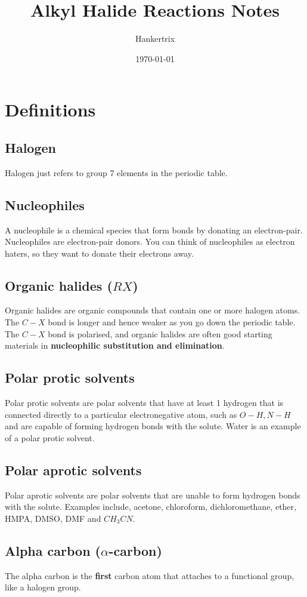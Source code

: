 \documentclass[11pt]{article}
\author{Hankertrix}
\date{\today}
\title{Alkyl Halide Reactions Notes}
\begin{document}
\maketitle
\setcounter{tocdepth}{2}
\tableofcontents \clearpage\section{Definitions}
\label{sec:org581be72}

\subsection{Halogen}
\label{sec:org85df69c}
Halogen just refers to group 7 elements in the periodic table.
\subsection{Nucleophiles}
\label{sec:orgd9ce489}
A nucleophile is a chemical species that form bonds by donating an electron-pair. Nucleophiles are electron-pair donors. You can think of nucleophiles as electron haters, so they want to donate their electrons away.
\subsection{Organic halides (\(RX\))}
\label{sec:orgf95e5ea}
Organic halides are organic compounds that contain one or more halogen atoms. The \(C - X\) bond is longer and hence weaker as you go down the periodic table. The \(C - X\) bond is polarised, and organic halides are often good starting materials in \textbf{nucleophilic substitution and elimination}.
\subsection{Polar protic solvents}
\label{sec:org1988e9f}
Polar protic solvents are polar solvents that have at least 1 hydrogen that is connected directly to a particular electronegative atom, such as \(O-H, N-H\) and are capable of forming hydrogen bonds with the solute. Water is an example of a polar protic solvent.
\subsection{Polar aprotic solvents}
\label{sec:org14b91c7}
Polar aprotic solvents are polar solvents that are unable to form hydrogen bonds with the solute. Examples include, acetone, chloroform, dichloromethane, ether, HMPA, DMSO, DMF and \(CH_3 CN\).
\subsection{Alpha carbon (\(\alpha\)-carbon)}
\label{sec:orge1b4fd8}
The alpha carbon is the \textbf{first} carbon atom that attaches to a functional group, like a halogen group.
\end{document}
